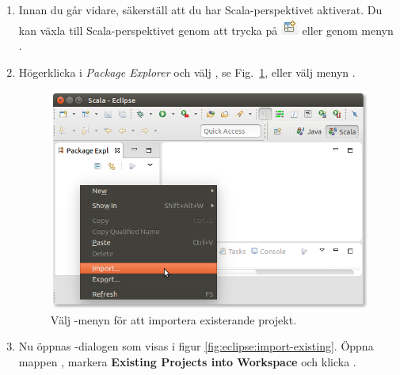 \begin{enumerate}
\item Innan du går vidare, säkerställ att du har Scala-perspektivet aktiverat. Du kan växla till Scala-perspektivet genom att trycka på \includegraphics[scale=0.75]{../img/eclipse/eclipse-perspective-button.png} eller genom menyn .


\item Högerklicka i \textit{Package Explorer} och välj , se Fig.~\ref{fig:eclipse:import}, eller välj menyn .

\begin{figure}[H]
\centering
\includegraphics[width=1.0\textwidth]{../img/eclipse/eclipse-import.png}
\caption {Välj -menyn för att importera existerande projekt.}
\label{fig:eclipse:import}
\end{figure}

\item Nu öppnas -dialogen som visas i figur \ref{fig:eclipse:import-existing}. Öppna mappen , markera \textbf{Existing Projects into Workspace} och klicka .




\end{enumerate}
